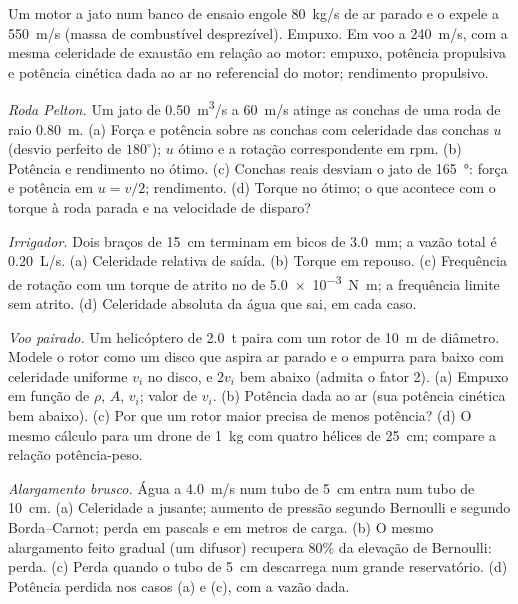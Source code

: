 \begin{exercise}[$\star$]\label{exo:b2:flow-balances:4}
Um motor a jato num banco de ensaio engole \qty{80}{kg/s} de ar parado e
o expele a \qty{550}{m/s} (massa de combustível desprezível). Empuxo. Em voo
a \qty{240}{m/s}, com a mesma celeridade de exaustão em relação ao motor: empuxo,
potência propulsiva e potência cinética dada ao ar no referencial do
motor; rendimento propulsivo.
\end{exercise}

\begin{exercise}[$\star\star$]\label{exo:b2:flow-balances:5}
\emph{Roda Pelton.} Um jato de \qty{0.50}{m^3/s} a \qty{60}{m/s} atinge as
conchas de uma roda de raio \qty{0.80}{m}. (a) Força e potência sobre as
conchas com celeridade das conchas $u$ (desvio perfeito de $180^\circ$); $u$ ótimo
e a rotação correspondente em rpm. (b) Potência e rendimento
no ótimo. (c) Conchas reais desviam o jato de \qty{165}{\degree}:
força e potência em $u = v/2$; rendimento. (d) Torque no ótimo;
o que acontece com o torque à roda parada e na velocidade de disparo?
\end{exercise}

\begin{exercise}[$\star\star$]\label{exo:b2:flow-balances:6}
\emph{Irrigador.} Dois braços de \qty{15}{cm} terminam em bicos de \qty{3.0}{mm};
a vazão total é \qty{0.20}{L/s}. (a) Celeridade relativa de saída. (b) Torque em
repouso. (c) Frequência de rotação com um torque de atrito no  de
\qty{5.0e-3}{N.m}; a frequência limite sem atrito. (d) Celeridade absoluta
da água que sai, em cada caso.
\end{exercise}

\begin{exercise}[$\star\star$]\label{exo:b2:flow-balances:7}
\emph{Voo pairado.} Um helicóptero de \qty{2.0}{t} paira com um rotor de
\qty{10}{m} de diâmetro. Modele o rotor como um disco que aspira ar parado
e o empurra para baixo com celeridade uniforme $v_i$ no disco, e $2v_i$ bem
abaixo (admita o fator 2). (a) Empuxo em função de $\rho$, $A$, $v_i$;
valor de $v_i$. (b) Potência dada ao ar (sua potência cinética bem
abaixo). (c) Por que um rotor maior precisa de menos potência? (d) O mesmo
cálculo para um drone de \qty{1}{kg} com quatro hélices de \qty{25}{cm};
compare a relação potência-peso.
\end{exercise}

\begin{exercise}[$\star\star$]\label{exo:b2:flow-balances:8}
\emph{Alargamento brusco.} Água a \qty{4.0}{m/s} num tubo de \qty{5}{cm} entra
num tubo de \qty{10}{cm}. (a) Celeridade a jusante; aumento de pressão segundo
Bernoulli e segundo Borda--Carnot; perda em pascals e em metros
de carga. (b) O mesmo alargamento feito gradual (um difusor) recupera $80\%$
da elevação de Bernoulli: perda. (c) Perda quando o tubo de \qty{5}{cm} descarrega
num grande reservatório. (d) Potência perdida nos casos (a) e (c), com a vazão dada.
\end{exercise}

